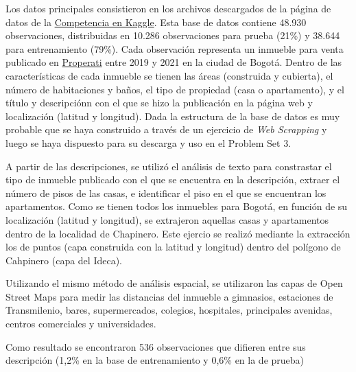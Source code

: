 \documentclass[
  11pt,
  letterpaper,
]{article}
\begin{document}
Los datos principales consistieron en los archivos descargados de la página de datos de la \href{https://www.kaggle.com/competitions/uniandes-bdml-202410-ps3}{Competencia en Kaggle}. Esta base de datos contiene 48.930 observaciones, distribuidas en 10.286 observaciones para prueba (21\%) y 38.644 para entrenamiento (79\%). Cada observación representa un inmueble para venta publicado en \href{ https://www.properati.com.co/}{Properati} entre 2019 y 2021 en la ciudad de Bogotá. Dentro de las características de cada inmueble se tienen las áreas (construida y cubierta), el número de habitaciones y baños, el tipo de propiedad (casa o apartamento), y el título y descripciónn con el que se hizo la publicación en la página web y localización (latitud y longitud). Dada la estructura de la base de datos es muy probable que se haya construido a través de un ejercicio de \textit{Web Scrapping} y luego se haya dispuesto para su descarga y uso en el Problem Set 3.

A partir de las descripciones, se utilizó el análisis de texto para constrastar el tipo de inmueble publicado con el que se encuentra en la descripción, extraer el número de pisos de las casas, e identificar el piso en el que se encuentran los apartamentos. Como se tienen todos los inmuebles para Bogotá, en función de su localización (latitud y longitud), se extrajeron aquellas casas y apartamentos dentro de la localidad de Chapinero. Este ejercio se realizó mediante la extracción los de puntos (capa construida con la latitud y longitud) dentro del polígono de Cahpinero (capa del Ideca).

Utilizando el mismo método de análisis espacial, se utilizaron las capas de Open Street Maps para medir las distancias del inmueble a gimnasios, estaciones de Transmilenio, bares, supermercados, colegios, hospitales, principales avenidas, centros comerciales y universidades.

Como resultado se encontraron 536 observaciones que difieren entre sus descripción (1,2\% en la base de entrenamiento y 0,6\% en la de prueba)
\end{document}
